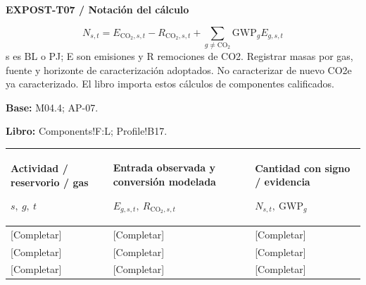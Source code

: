 \par\begingroup\sffamily\fontsize{8}{10}\selectfont\color{NEBGreen}\setlength{\parskip}{2pt}\setlength{\abovedisplayskip}{4pt}\setlength{\belowdisplayskip}{4pt}\setlength{\abovedisplayshortskip}{2pt}\setlength{\belowdisplayshortskip}{3pt}
\textbf{EXPOST-T07 / Notación del cálculo}\par
{\fontsize{9}{11}\selectfont\[ N_{s,t}=E_{\mathrm{CO_2},s,t}-R_{\mathrm{CO_2},s,t}+\sum_{g\ne\mathrm{CO_2}}\mathrm{GWP}_gE_{g,s,t} \]}
s es BL o PJ; E son emisiones y R remociones de CO2. Registrar masas por gas, fuente y horizonte de caracterización adoptados. No caracterizar de nuevo CO2e ya caracterizado. El libro importa estos cálculos de componentes calificados.\par
\textbf{Base:} M04.4; AP-07.\par
\textbf{Libro:} Components!F:L; Profile!B17.\par\endgroup
{\sffamily\fontsize{8.3}{10.3}\selectfont\begin{longtable}{@{}P{54.83mm} P{54.83mm} P{54.83mm}@{}}
\toprule
\textbf{Actividad / reservorio / gas}\par {\normalfont\fontsize{8.2}{10}\selectfont $s,\ g,\ t$} & \textbf{Entrada observada y conversión modelada}\par {\normalfont\fontsize{8.2}{10}\selectfont $E_{g,s,t},\ R_{\mathrm{CO_2},s,t}$} & \textbf{Cantidad con signo / evidencia}\par {\normalfont\fontsize{8.2}{10}\selectfont $N_{s,t},\ \mathrm{GWP}_g$}\\\midrule\endhead
\rule{0pt}{8mm}[Completar] & [Completar] & [Completar]\\\hline
\rule{0pt}{8mm}[Completar] & [Completar] & [Completar]\\\hline
\rule{0pt}{8mm}[Completar] & [Completar] & [Completar]\\\hline
\end{longtable}}
